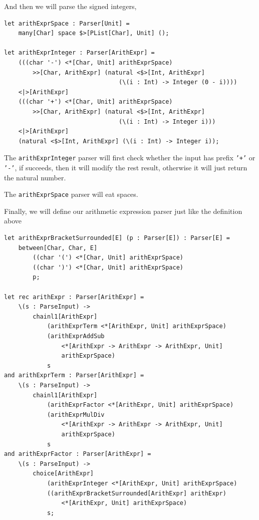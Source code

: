 And then we will parse the signed integers,

\begin{lstlisting}
let arithExprSpace : Parser[Unit] =
    many[Char] space $>[PList[Char], Unit] ();

let arithExprInteger : Parser[ArithExpr] =
    (((char '-') <*[Char, Unit] arithExprSpace)
        >>[Char, ArithExpr] (natural <$>[Int, ArithExpr]
                                (\(i : Int) -> Integer (0 - i))))
    <|>[ArithExpr]
    (((char '+') <*[Char, Unit] arithExprSpace)
        >>[Char, ArithExpr] (natural <$>[Int, ArithExpr]
                                (\(i : Int) -> Integer i)))
    <|>[ArithExpr]
    (natural <$>[Int, ArithExpr] (\(i : Int) -> Integer i));
\end{lstlisting}

The \texttt{arithExprInteger} parser will first check whether the input has prefix \texttt{'+'} or \texttt{'-'}, if succeeds, then it will modify the rest result, otherwise it will just return the natural number.

The \texttt{arithExprSpace} parser will eat spaces.

Finally, we will define our arithmetic expression parser just like the definition above

\begin{lstlisting}
let arithExprBracketSurrounded[E] (p : Parser[E]) : Parser[E] =
    between[Char, Char, E]
        ((char '(') <*[Char, Unit] arithExprSpace)
        ((char ')') <*[Char, Unit] arithExprSpace)
        p;

let rec arithExpr : Parser[ArithExpr] =
    \(s : ParseInput) ->
        chainl1[ArithExpr]
            (arithExprTerm <*[ArithExpr, Unit] arithExprSpace)
            (arithExprAddSub
                <*[ArithExpr -> ArithExpr -> ArithExpr, Unit]
                arithExprSpace)
            s
and arithExprTerm : Parser[ArithExpr] =
    \(s : ParseInput) ->
        chainl1[ArithExpr]
            (arithExprFactor <*[ArithExpr, Unit] arithExprSpace)
            (arithExprMulDiv
                <*[ArithExpr -> ArithExpr -> ArithExpr, Unit]
                arithExprSpace)
            s
and arithExprFactor : Parser[ArithExpr] =
    \(s : ParseInput) ->
        choice[ArithExpr]
            (arithExprInteger <*[ArithExpr, Unit] arithExprSpace)
            ((arithExprBracketSurrounded[ArithExpr] arithExpr)
                <*[ArithExpr, Unit] arithExprSpace)
            s;
\end{lstlisting}

